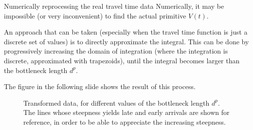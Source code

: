 \documentclass{beamer}
\begin{document}
\begin{frame}{Numerically reprocessing the real travel time data}
  Numerically, it may be impossible (or very inconvenient) to find the actual primitive \(V(t)\).

An approach that can be taken (especially when the travel time function is just a discrete set of values) is to directly approximate the integral.
This can be done by progressively increasing the domain of integration (where the integration is discrete, approximated with trapezoids),
until the integral becomes larger than the bottleneck length \(d^p\).

The figure in the following slide shows the result of this process.
\end{frame}

\begin{frame}
\begin{figure}
  \centering
  \caption{Transformed data, for different values of the bottleneck length $d^p$. The lines whose steepness yields late and early arrivals are shown for reference, in order to be able to appreciate the increasing steepness.}
  \label{fig:modifying_data}
\end{figure}


\end{frame}
\end{document}
